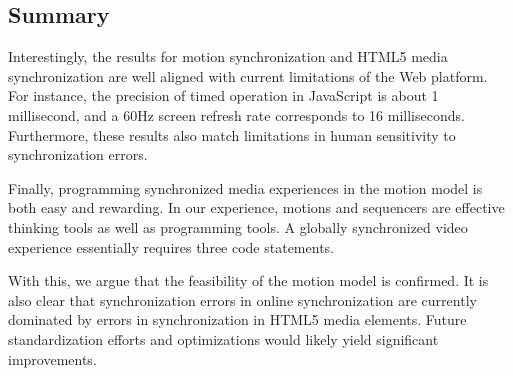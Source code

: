 \subsection {Summary}

Interestingly, the results for motion synchronization and HTML5 media
synchronization are well aligned with current limitations of the Web platform.
For instance, the precision of timed operation in JavaScript is about 1
millisecond, and a 60Hz screen refresh rate corresponds to 16 milliseconds.
Furthermore, these results also match limitations in human sensitivity to
synchronization errors. 

Finally, programming synchronized media experiences in the motion model is
both easy and rewarding. In our experience, motions and sequencers are
effective thinking tools as well as programming tools. A globally synchronized
video experience essentially requires three code statements.

With this, we argue that the feasibility of the motion model is confirmed. It
is also clear that synchronization errors in online synchronization are
currently dominated by errors in synchronization in HTML5 media elements.
Future standardization efforts and optimizations would likely yield
significant improvements.